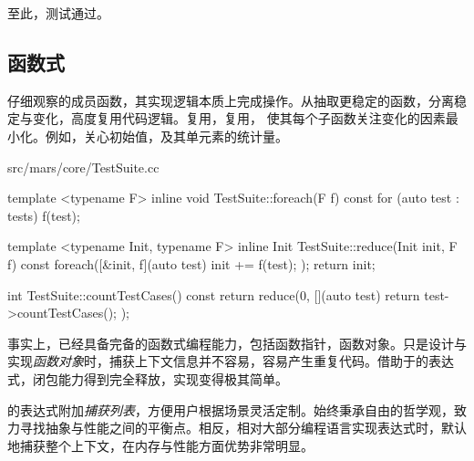 \begin{content}
至此，测试通过。

\subsection{函数式}

仔细观察的成员函数，其实现逻辑本质上完成操作。从抽取更稳定的函数，分离稳定与变化，高度复用代码逻辑。复用，复用， 使其每个子函数关注变化的因素最小化。例如，关心初始值，及其单元素的统计量。

\begin{nodiff}{src/mars/core/TestSuite.cc}
 \begin{c++}
template <typename F>
inline void TestSuite::foreach(F f) const {
  for (auto test : tests) {
    f(test);
  }
}

template <typename Init, typename F>
inline Init TestSuite::reduce(Init init, F f) const {
  foreach([&init, f](auto test) {
    init += f(test);
  });
  return init;
}

int TestSuite::countTestCases() const {
  return reduce(0, [](auto test){
    return test->countTestCases();
  });
}
 \end{c++}
\end{nodiff}

事实上，已经具备完备的函数式编程能力，包括函数指针，函数对象。只是设计与实现\emph{函数对象}时，捕获上下文信息并不容易，容易产生重复代码。借助于的表达式，闭包能力得到完全释放，实现变得极其简单。

的表达式附加\emph{捕获列表}，方便用户根据场景灵活定制。\cpp{}始终秉承自由的哲学观，致力寻找抽象与性能之间的平衡点。相反，相对大部分编程语言实现表达式时，默认地捕获整个上下文，在内存与性能方面\cpp{}优势非常明显。

\end{content}
